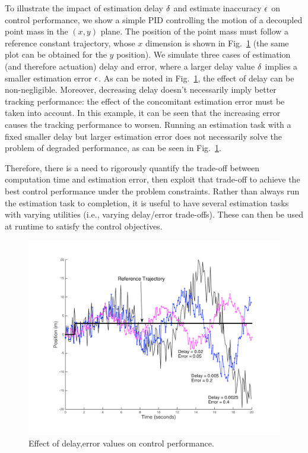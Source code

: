 \begin{exmp}
\label{motivatingExample}
To illustrate the impact of estimation delay $\delta$ and estimate inaccuracy $\epsilon$ on control performance, we show a simple PID controlling the motion of a decoupled point mass in the $(x,y)$ plane.
The position of the point mass must follow a reference constant trajectory, whose $x$ dimension is shown in Fig.~\ref{fig:toyplot} (the same plot can be obtained for the $y$ position).
We simulate three cases of estimation (and therefore actuation) delay and error, where a larger delay value $\delta$ implies a smaller estimation error $\epsilon$.
As can be noted in Fig.~\ref{fig:toyplot}, the effect of delay can be non-negligible.
Moreover, decreasing delay doesn't necessarily imply better tracking performance: the effect of the concomitant estimation error must be taken into account. 
In this example, it can be seen that the increasing error causes the tracking performance to worsen.
Running an estimation task with a fixed smaller delay but larger estimation error does not necessarily solve the problem of degraded performance, as can be seen in Fig.~\ref{fig:toyplot}.

Therefore, there is a need to rigorously quantify the trade-off between computation time and estimation error, then exploit that trade-off to achieve the best control performance under the problem constraints.
Rather than always run the estimation task to completion, it is useful to have several estimation tasks with varying utilities (i.e., varying delay/error trade-offs).
These can then be used at runtime to satisfy the control objectives.
\exmend

\begin{figure}[t]
\centering
\includegraphics[scale=0.3]{figures/toyplot}
\caption{Effect of delay,error values on control performance.}
\label{fig:toyplot}
\end{figure}
\end{exmp}

